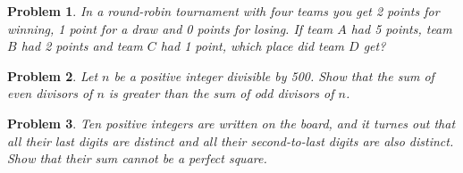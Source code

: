 \documentclass[a4paper,12pt]{article}
\theoremstyle{perfect}
\newtheorem{prb}{Problem}
\begin{document}
\begin{prb}
In a round-robin tournament with four teams you get 2 points for winning, 1 point for a draw and 0 points for losing. If team $A$ had 5 points, team $B$ had 2 points and team $C$ had 1 point, which place did team $D$ get?
\end{prb}

\begin{prb}
Let $n$ be a positive integer divisible by 500. Show that the sum of even divisors of $n$ is greater than the sum of odd divisors of $n$. 
\end{prb}

\begin{prb}
Ten positive integers are written on the board, and it turnes out that all their last digits are distinct and all their second-to-last digits are also distinct. Show that their sum cannot be a perfect square. 
\end{prb}
\end{document}
